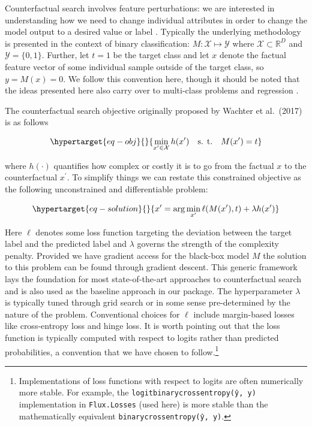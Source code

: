 \documentclass[
  letterpaper,
  DIV=11,
  numbers=noendperiod]{scrartcl}
\begin{document}
Counterfactual search involves feature perturbations: we are interested
in understanding how we need to change individual attributes in order to
change the model output to a desired value or label
\cite{molnar2020interpretable}. Typically the underlying methodology is
presented in the context of binary classification:
\(M: \mathcal{X} \mapsto \mathcal{Y}\) where
\(\mathcal{X}\subset\mathbb{R}^D\) and \(\mathcal{Y}=\{0,1\}\). Further,
let \(t=1\) be the target class and let \(x\) denote the factual feature
vector of some individual sample outside of the target class, so
\(y=M(x)=0\). We follow this convention here, though it should be noted
that the ideas presented here also carry over to multi-class problems
and regression \cite{molnar2020interpretable}.

The counterfactual search objective originally proposed by Wachter et
al.~(2017) \cite{wachter2017counterfactual} is as follows

\begin{equation}\protect\hypertarget{eq-obj}{}{
\min_{x^\prime \in \mathcal{X}} h(x^\prime) \ \ \ \mbox{s. t.} \ \ \ M(x^\prime) = t
}\label{eq-obj}\end{equation}

where \(h(\cdot)\) quantifies how complex or costly it is to go from the
factual \(x\) to the counterfactual \(x^\prime\). To simplify things we
can restate this constrained objective as the following unconstrained
and differentiable problem:

\begin{equation}\protect\hypertarget{eq-solution}{}{
x^\prime = \arg \min_{x^\prime}  \ell(M(x^\prime),t) + \lambda h(x^\prime)
}\label{eq-solution}\end{equation}

Here \(\ell\) denotes some loss function targeting the deviation between
the target label and the predicted label and \(\lambda\) governs the
strength of the complexity penalty. Provided we have gradient access for
the black-box model \(M\) the solution to this problem can be found
through gradient descent. This generic framework lays the foundation for
most state-of-the-art approaches to counterfactual search and is also
used as the baseline approach in our package. The hyperparameter
\(\lambda\) is typically tuned through grid search or in some sense
pre-determined by the nature of the problem. Conventional choices for
\(\ell\) include margin-based losses like cross-entropy loss and hinge
loss. It is worth pointing out that the loss function is typically
computed with respect to logits rather than predicted probabilities, a
convention that we have chosen to follow.\footnote{Implementations of
  loss functions with respect to logits are often numerically more
  stable. For example, the \texttt{logitbinarycrossentropy(ŷ,\ y)}
  implementation in \texttt{Flux.Losses} (used here) is more stable than
  the mathematically equivalent \texttt{binarycrossentropy(ŷ,\ y)}.}
\end{document}
